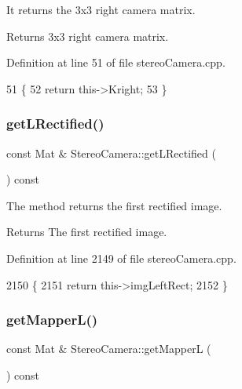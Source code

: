 It returns the 3x3 right camera matrix. 

\begin{DoxyReturn}{Returns}
3x3 right camera matrix. 
\end{DoxyReturn}


Definition at line 51 of file stereo\+Camera.\+cpp.


\begin{DoxyCode}
51                                          \{
52     \textcolor{keywordflow}{return} this->Kright;
53 \}
\end{DoxyCode}
\mbox{\label{classStereoCamera_ad81c9f7f4f15ef3f1e61d34fd8df9856}} 
\subsubsection{\texorpdfstring{get\+L\+Rectified()}{getLRectified()}}
{\footnotesize\ttfamily const Mat \& Stereo\+Camera\+::get\+L\+Rectified (\begin{DoxyParamCaption}{ }\end{DoxyParamCaption}) const}



The method returns the first rectified image. 

\begin{DoxyReturn}{Returns}
The first rectified image. 
\end{DoxyReturn}


Definition at line 2149 of file stereo\+Camera.\+cpp.


\begin{DoxyCode}
2150 \{
2151     \textcolor{keywordflow}{return} this->imgLeftRect;
2152 \}
\end{DoxyCode}
\mbox{\label{classStereoCamera_ae1c7ef2cc1a3de5d10c6bb39fbb78719}} 
\subsubsection{\texorpdfstring{get\+Mapper\+L()}{getMapperL()}}
{\footnotesize\ttfamily const Mat \& Stereo\+Camera\+::get\+MapperL (\begin{DoxyParamCaption}{ }\end{DoxyParamCaption}) const}



